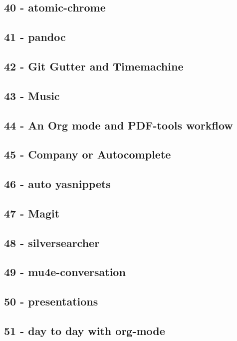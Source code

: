 \documentclass[11pt]{article}
\begin{document}
\subsection{40 - atomic-chrome}
\label{sec:org527edde}
\subsection{41 - pandoc}
\label{sec:org226d9ca}
\subsection{42 - Git Gutter and Timemachine}
\label{sec:orgc21395d}
\subsection{43 - Music}
\label{sec:org38ed934}
\subsection{44 - An Org mode and PDF-tools workflow}
\label{sec:org4c77523}
\subsection{45 - Company or Autocomplete}
\label{sec:org8fcdc6b}
\subsection{46 - auto yasnippets}
\label{sec:org3f2484b}
\subsection{47 - Magit}
\label{sec:org8f870ed}
\subsection{48 - silversearcher}
\label{sec:org989100b}
\subsection{49 - mu4e-conversation}
\label{sec:org493dbd3}
\subsection{50 - presentations}
\label{sec:org864bbcd}
\subsection{51 - day to day with org-mode}
\label{sec:orga9449e3}
\end{document}
